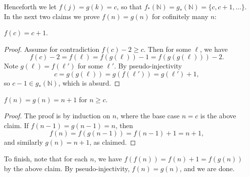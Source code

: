 Henceforth we let $f(j)=g(k)=c$, so that $f_*(\mathbb N)=g_*(\mathbb N)=\{c,c+1,\ldots\}$. In the next two claims we prove $f(n)=g(n)$ for cofinitely many $n$:
\begin{iclaim}
    $f(c)=c+1$.
\end{iclaim}
\begin{proof}
    Assume for contradiction $f(c)-2\ge c$. Then for some $\ell$, we have \[f(c)-2=f(\ell)=f(g(\ell))-1=f(g(g(\ell)))-2.\]
    Note $g(\ell)=f(\ell')$ for some $\ell'$. By pseudo-injectivity \[c=g(g(\ell))=g(f(\ell'))=g(\ell')+1,\]
    so $c-1\in g_*(\mathbb N)$, which is absurd.
\end{proof}
\begin{iclaim}
    $f(n)=g(n)=n+1$ for $n\ge c$.
\end{iclaim}
\begin{proof}
    The proof is by induction on $n$, where the base case $n=c$ is the above claim. If $f(n-1)=g(n-1)=n$, then \[f(n)=f(g(n-1))=f(n-1)+1=n+1,\]
    and similarly $g(n)=n+1$, as claimed.
\end{proof}

To finish, note that for each $n$, we have $f(f(n))=f(n)+1=f(g(n))$ by the above claim. By pseudo-injectivity, $f(n)=g(n)$, and we are done.

